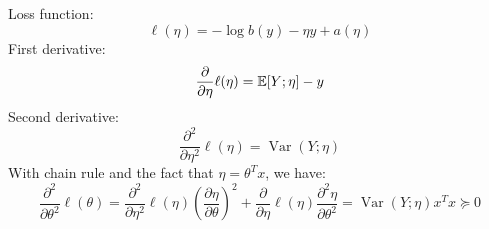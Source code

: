 \begin{answer}
    Loss function:
    $$
    \ell(\eta) = - \log b(y) - \eta y + a(\eta)
    $$
    First derivative:
    $$
    \frac{\partial}{\partial \eta} \ell(\eta) = \mathbb{E}[Y; \eta] - y
    $$
    Second derivative:
    $$
    \frac{\partial^2}{\partial \eta^2} \ell(\eta) = \operatorname{Var}(Y; \eta)
    $$
    With chain rule and the fact that $\eta = \theta^T x$, we have:
    $$
    \frac{\partial^2}{\partial \theta^2} \ell(\theta) = \frac{\partial^2}{\partial \eta^2} \ell(\eta) \left(\frac{\partial \eta}{\partial \theta}\right)^2 + \frac{\partial}{\partial \eta} \ell(\eta) \frac{\partial^2 \eta}{\partial \theta^2} = \operatorname{Var}(Y; \eta) x^T x \succcurlyeq 0
    $$
\end{answer}
